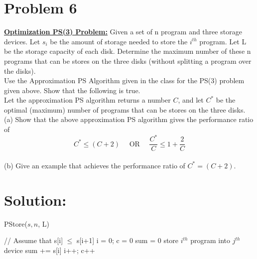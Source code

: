 
\section*{Problem 6}
	\textbf{\underline{Optimization PS(3) Problem:}} Given a set of n program and three storage devices. Let $s_i$ be the amount of storage needed to store the $i^{th}$ program. Let L be the storage capacity of each disk. Determine the maximum number of these n programs that can be stores on the three disks (without splitting a program over the disks).\\
	
	\noindent
	Use the Approximation PS Algorithm given in the class for the PS(3) problem given above. Show that the following is true.\\
	
	\noindent
	Let the approximation PS algorithm returns a number $C$, and let $C^*$ be the optimal (maximum) number of programs that can be stores on the three disks.\\
	(a) Show that the above approximation PS algorithm gives the performance ratio of\[C^* \leq (C+2) \quad\text{ OR }\quad \frac{C^*}{C} \leq 1 + \frac{2}{C}\]\\
	
	\noindent
	(b) Give an example that achieves the performance ratio of $C^* = (C+2)$.
\section*{Solution:}
	\begin{algorithm}[H]
		\caption{PStore($s, n$, L)}
		\begin{algorithmic}[1]
			\State // Assume that s[i] $\leq$ s[i+1] 
			\State i = 0; c = 0 
				\State sum = 0
					\State store $i^{th}$ program into $j^{th}$ device
					\State sum += s[i]
					\State i++; c++
						\State \Return
					\EndIf
				\EndWhile
			\EndFor
		\end{algorithmic}
	\end{algorithm}

